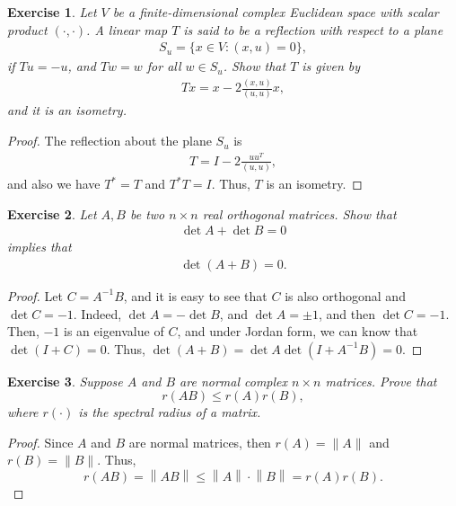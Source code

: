 \documentclass[10pt]{book}
\newtheorem{exercise}{Exercise}[section]
\theoremstyle{definition}
\numberwithin{equation}{chapter}
\begin{document}
\begin{exercise}
Let $V$ be a finite-dimensional complex Euclidean space with scalar product $(\cdot, \cdot)$. A linear map $T$ is said to be a reflection with respect to a plane
\begin{align*}
    S_u = \{x \in V: (x,u) = 0\},
\end{align*}
if $Tu = -u$, and $Tw = w$ for all $w \in S_u$. Show that $T$ is given by 
\begin{align*}
    Tx = x - 2 \frac{(x,u)}{(u,u)}x,
\end{align*}
and it is an isometry.
\end{exercise}
\begin{proof}
The reflection about the plane $S_u$ is 
\begin{align*}
    T = I - 2\frac{uu^T}{(u,u)},
\end{align*}
and also we have $T^* = T$ and $T^*T = I$. Thus, $T$ is an isometry.
\end{proof}

\medskip

\begin{exercise}
Let $A, B$ be two $n \times n$ real orthogonal matrices. Show that
\begin{align*}
    \det A + \det B = 0
\end{align*}
implies that 
\begin{align*}
    \det (A + B) = 0.
\end{align*}
\end{exercise}
\begin{proof}
Let $C = A^{-1}B$, and it is easy to see that $C$ is also orthogonal and $\det C = -1$. Indeed, $\det A = - \det B$, and $\det A = \pm 1$, and then $\det C = -1$. Then, $-1$ is an eigenvalue of $C$, and under Jordan form, we can know that $\det (I + C) = 0$. Thus, $\det (A + B) = \det A \det (I + A^{-1}B) = 0$.
\end{proof}

\medskip

\begin{exercise}
Suppose $A$ and $B$ are normal complex $n \times n$ matrices. Prove that
$$r(AB) \leq r(A) r(B),$$
where $r(\cdot)$ is the spectral radius of a matrix.
\end{exercise}
\begin{proof}
Since $A$ and $B$ are normal matrices, then $r(A) = \|A\|$ and $r(B) = \|B\|$. Thus, 
$$r(AB) = \left\|AB\right\| \leq \left\|A\right\| \cdot \left\|B\right\| = r(A) r(B).$$
\end{proof}
\end{document}
